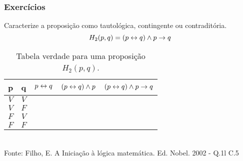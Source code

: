 \begin{frame}[t]
    \frametitle{Exercícios}
    \begin{exampleblock}{Caracterize a proposição como tautológica, contingente ou contraditória.}
        \begin{equation}
            H_2(p,q) = (p \leftrightarrow q) \land p \rightarrow q
        \end{equation}
    \end{exampleblock}
    \begin{table}[]
        \caption{Tabela verdade para uma proposição $H_2(p,q)$.}
        \label{tab:exercise-22}
        \begin{tabular}{|c|c|c|c|c|}
            \hline
            \rowcolor[HTML]{EFEFEF} 
            \textbf{p} & \textbf{q} & $p \leftrightarrow q$ & $(p \leftrightarrow q) \land p$ & $(p \leftrightarrow q) \land p \rightarrow q$ \\ \hline
            $V$        & $V$        &           &                  &                         \\ \hline
            $V$        & $F$        &           &                  &                         \\ \hline
            $F$        & $V$        &           &                  &                         \\ \hline
            $F$        & $F$        &           &                  &                         \\ \hline
        \end{tabular}
        \\
        \centering \tiny{Fonte: Filho, E. A Iniciação à lógica matemática. Ed. Nobel. 2002 - Q.1l C.5}
    \end{table}
\end{frame}
%
